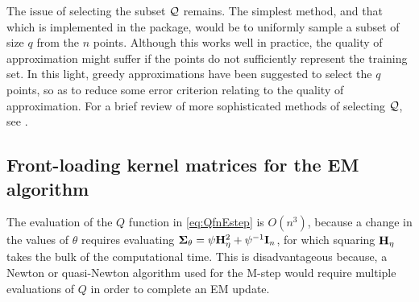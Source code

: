 The issue of selecting the subset ${\mathcal Q}$ remains.
The simplest method, and that which is implemented in the  package, 
would be to uniformly sample a subset of size $q$ from the $n$ points.
Although this works well in practice, the quality of approximation might suffer if the points do not sufficiently represent the training set.
In this light, greedy approximations have been suggested to select the $q$ points, so as to reduce some error criterion relating to the quality of approximation.
For a brief review of more sophisticated methods of selecting ${\mathcal Q}$, see \citet[§8.1, pp. 173--174]{rasmussen2006gaussian}.


\subsection{Front-loading kernel matrices for the EM algorithm}
\label{sec:efficientEM1}

The evaluation of the $Q$ function in \cref{eq:QfnEstep} is $O(n^3)$, because a change in the values of $\theta$ requires evaluating ${\bm\Sigma}_\theta = \psi{\mathbf H}_\eta^2 + \psi^{-1}{\mathbf I}_n$, for which squaring ${\mathbf H}_\eta$ takes the bulk of the computational time.
This is disadvantageous because, a Newton or quasi-Newton algorithm used for the M-step would require multiple evaluations of $Q$ in order to complete an EM update.


